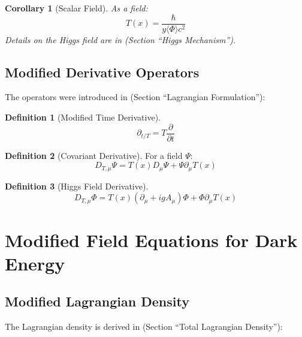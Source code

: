 \documentclass[a4paper,12pt]{article}
\newtheorem{corollary}[theorem]{Corollary}
\theoremstyle{definition}
\newtheorem{definition}{Definition}[theorem]
\theoremstyle{remark}
\newcommand{\Tfield}{T(x)}
\newcommand{\DhiggsT}{\Tfield (\partial_\mu + ig A_\mu) \Phi + \Phi \partial_\mu \Tfield}
\begin{document}
	\begin{corollary}[Scalar Field]
		As a field:
		\begin{equation}
			\Tfield = \frac{\hbar}{y \langle\Phi\rangle c^2}
		\end{equation}
		Details on the Higgs field are in \cite{pascher_higgs_2025} (Section “Higgs Mechanism”).
	\end{corollary}
	
	\subsection{Modified Derivative Operators}
	
	The operators were introduced in \cite{pascher_lagrange_2025} (Section “Lagrangian Formulation”):
	
	\begin{definition}[Modified Time Derivative]
		\begin{equation}
			\partial_{t/T} = T \frac{\partial}{\partial t}
		\end{equation}
	\end{definition}
	
	\begin{definition}[Covariant Derivative]
		For a field \(\Psi\):
		\begin{equation}
			D_{T,\mu} \Psi = \Tfield D_\mu \Psi + \Psi \partial_\mu \Tfield
		\end{equation}
	\end{definition}
	
	\begin{definition}[Higgs Field Derivative]
		\begin{equation}
			D_{T,\mu} \Phi = \DhiggsT
		\end{equation}
	\end{definition}
	
	\section{Modified Field Equations for Dark Energy}
	
	\subsection{Modified Lagrangian Density}
	
	The Lagrangian density is derived in \cite{pascher_lagrange_2025} (Section “Total Lagrangian Density”):
	
\end{document}
